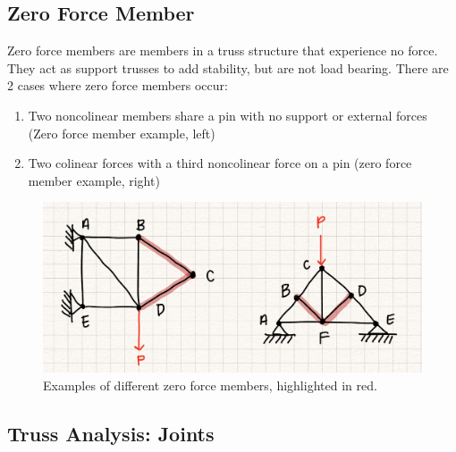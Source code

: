     
\subsection{Zero Force Member}

Zero force members are members in a truss structure that experience no force. They act as support trusses to add stability, but are not load bearing. There are 2 cases where zero force members occur: 
\begin{enumerate}
    \item Two noncolinear members share a pin with no support or external forces (Zero force member example, left)
    \item Two colinear forces with a third noncolinear force on a pin (zero force member example, right)
\end{enumerate}

\begin{figure}[!h]
\centering
\includegraphics[angle=0, width=5in]{TrussFigures/0ForceMembers.jpg}
\vspace{-2mm}
\caption{\small Examples of different zero force members, highlighted in red.}
\vspace{-3mm}
\label{Fig:0ForceMembers}
\end{figure}



\subsection{Truss Analysis: Joints}

